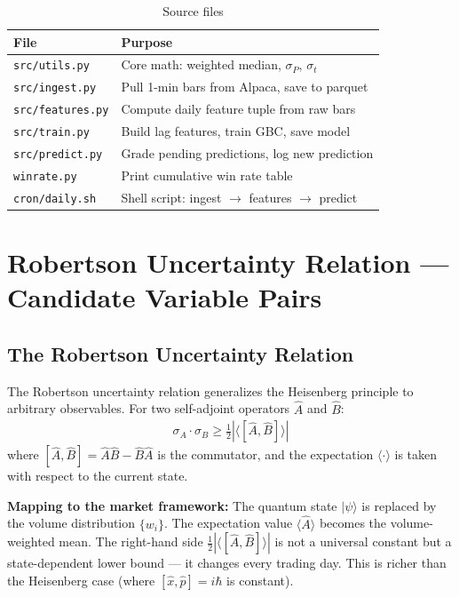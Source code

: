 \documentclass[preprint,12pt]{elsarticle}
\begin{document}
\begin{table}[htbp]
\centering
\caption{Source files}
\begin{tabular}{ll}
\toprule
File & Purpose \\
\midrule
\texttt{src/utils.py}    & Core math: weighted median, $\sigma_P$, $\sigma_t$ \\
\texttt{src/ingest.py}   & Pull 1-min bars from Alpaca, save to parquet \\
\texttt{src/features.py} & Compute daily feature tuple from raw bars \\
\texttt{src/train.py}    & Build lag features, train GBC, save model \\
\texttt{src/predict.py}  & Grade pending predictions, log new prediction \\
\texttt{winrate.py}      & Print cumulative win rate table \\
\texttt{cron/daily.sh}   & Shell script: ingest $\to$ features $\to$ predict \\
\bottomrule
\end{tabular}
\end{table}

\section{Robertson Uncertainty Relation --- Candidate Variable Pairs}

\subsection{The Robertson Uncertainty Relation}

The Robertson uncertainty relation generalizes the Heisenberg principle to arbitrary observables. For two self-adjoint operators $\hat{A}$ and $\hat{B}$:
\begin{align}
    \sigma_A \cdot \sigma_B \geq \frac{1}{2}\left|\langle [\hat{A}, \hat{B}] \rangle\right|
\end{align}
where $[\hat{A}, \hat{B}] = \hat{A}\hat{B} - \hat{B}\hat{A}$ is the commutator, and the expectation $\langle \cdot \rangle$ is taken with respect to the current state.

\textbf{Mapping to the market framework:} The quantum state $|\psi\rangle$ is replaced by the volume distribution $\{w_i\}$. The expectation value $\langle \hat{A} \rangle$ becomes the volume-weighted mean. The right-hand side $\frac{1}{2}|\langle[\hat{A},\hat{B}]\rangle|$ is not a universal constant but a state-dependent lower bound --- it changes every trading day. This is richer than the Heisenberg case (where $[\hat{x},\hat{p}] = i\hbar$ is constant).
\end{document}
